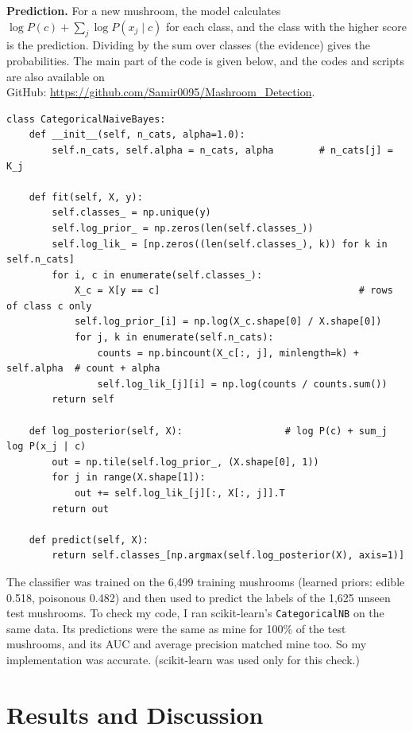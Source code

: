 \documentclass[12pt,a4paper]{article}
\begin{document}
\textbf{Prediction.} For a new mushroom, the model calculates
$\log P(c)+\sum_j \log P(x_j\mid c)$ for each class, and the class
with the higher score is the prediction. Dividing by the sum over
classes (the evidence) gives the probabilities. The main part of the
code is given below, and the codes and scripts are also available on \\ GitHub:
\url{https://github.com/Samir0095/Mashroom_Detection}.

\begin{singlespace}
\begin{lstlisting}
class CategoricalNaiveBayes:
    def __init__(self, n_cats, alpha=1.0):
        self.n_cats, self.alpha = n_cats, alpha        # n_cats[j] = K_j

    def fit(self, X, y):
        self.classes_ = np.unique(y)
        self.log_prior_ = np.zeros(len(self.classes_))
        self.log_lik_ = [np.zeros((len(self.classes_), k)) for k in self.n_cats]
        for i, c in enumerate(self.classes_):
            X_c = X[y == c]                                   # rows of class c only
            self.log_prior_[i] = np.log(X_c.shape[0] / X.shape[0])
            for j, k in enumerate(self.n_cats):
                counts = np.bincount(X_c[:, j], minlength=k) + self.alpha  # count + alpha
                self.log_lik_[j][i] = np.log(counts / counts.sum())
        return self

    def log_posterior(self, X):                  # log P(c) + sum_j log P(x_j | c)
        out = np.tile(self.log_prior_, (X.shape[0], 1))
        for j in range(X.shape[1]):
            out += self.log_lik_[j][:, X[:, j]].T
        return out

    def predict(self, X):
        return self.classes_[np.argmax(self.log_posterior(X), axis=1)]
\end{lstlisting}
\end{singlespace}

The classifier was trained on the 6,499 training mushrooms (learned priors: edible 0.518, poisonous 0.482) and then used to predict the labels of the 1,625 unseen test mushrooms. To check my code, I ran scikit-learn's \texttt{CategoricalNB} \cite{pedregosa2011} on the same data. Its predictions were the same as mine for 100\% of the test mushrooms, and its AUC and average precision matched mine too. So my implementation was accurate. (scikit-learn was used only for this check.)

\section{Results and Discussion}
\end{document}
